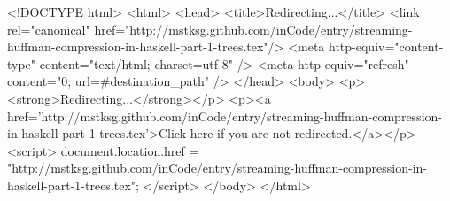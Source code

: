 <!DOCTYPE html>
<html>
<head>
<title>Redirecting...</title>
<link rel="canonical" href="http://mstksg.github.com/inCode/entry/streaming-huffman-compression-in-haskell-part-1-trees.tex"/>
<meta http-equiv="content-type" content="text/html; charset=utf-8" />
<meta http-equiv="refresh" content="0; url=#{destination_path}" />
</head>
<body>
  <p><strong>Redirecting...</strong></p>
  <p><a href='http://mstksg.github.com/inCode/entry/streaming-huffman-compression-in-haskell-part-1-trees.tex'>Click here if you are not redirected.</a></p>
  <script>
    document.location.href = "http://mstksg.github.com/inCode/entry/streaming-huffman-compression-in-haskell-part-1-trees.tex";
  </script>
</body>
</html>
